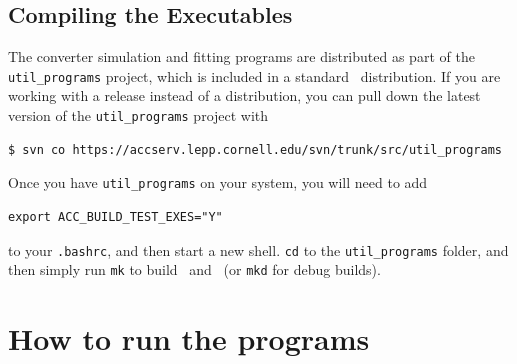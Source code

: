 \documentclass[12pt]{article}
\begin{document}
\subsection{Compiling the Executables}
The converter simulation and fitting programs are distributed as part of the \texttt{util\_programs} project, which is included in a standard \bmad \, distribution.
If you are working with a release instead of a distribution, you can pull down the latest version of the \texttt{util\_programs} project with
\begin{verbatim}
$ svn co https://accserv.lepp.cornell.edu/svn/trunk/src/util_programs
\end{verbatim}
Once you have \texttt{util\_programs} on your system, you will need to add
\begin{verbatim}
export ACC_BUILD_TEST_EXES="Y"
\end{verbatim}
to your \texttt{.bashrc}, and then start a new shell.
\texttt{cd} to the \texttt{util\_programs} folder, and then simply run \texttt{mk} to build \exes \, and \exef \, (or \texttt{mkd} for debug builds).



\section{How to run the programs}
\end{document}
